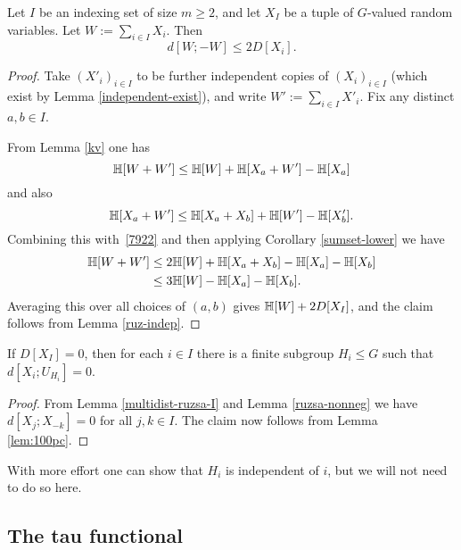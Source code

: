 \begin{lemma}\label{multidist-ruzsa-IV}
  Let $I$ be an indexing set of size $m \ge 2$, and let $X_{I}$ be a tuple of $G$-valued random variables.  Let $W := \sum_{i \in I} X_i$. Then
  $$ d[W;-W] \leq 2 D[X_i].$$
\end{lemma}

\begin{proof}
  Take $(X'_i)_{i \in I}$ to be further independent copies of $(X_i)_{i \in I}$ (which exist by Lemma \ref{independent-exist}), and write $W' := \sum_{i \in I} X'_i$.
  Fix any distinct $a,b \in I$.

  From Lemma \ref{kv} one has
  \begin{equation}\label{7922}
    \mathbb{H}[W + W'] \leq  \mathbb{H}[W] + \mathbb{H}[X_{a} + W'] - \mathbb{H}[X_{a}]
   \end{equation}
   and also
   \[ \mathbb{H}[X_a + W'] \leq \mathbb{H}[X_a + X_b] + \mathbb{H}[W'] - \mathbb{H}[X'_b].\]
   Combining this with~\eqref{7922} and then applying Corollary \ref{sumset-lower} we have
   \begin{align*}  \mathbb{H}[W + W']  & \leq    2\mathbb{H}[W] + \mathbb{H}[X_a + X_b]  - \mathbb{H}[X_a] - \mathbb{H}[X_b] \\ & \leq
    3 \mathbb{H}[W] - \mathbb{H}[X_a] - \mathbb{H}[X_b].
  \end{align*}
  Averaging this over all choices of $(a,b)$ gives $\mathbb{H}[W] + 2 D[X_I]$, and the claim follows from Lemma \ref{ruz-indep}.
\end{proof}

\begin{proposition}[Vanishing]\label{multi-zero}
If $D[X_I]=0$, then for each $i \in I$ there is a finite subgroup $H_i \leq G$ such that $d[X_i; U_{H_i}] = 0$.
\end{proposition}

\begin{proof}  From Lemma \ref{multidist-ruzsa-I} and Lemma \ref{ruzsa-nonneg} we have $d[X_j; X_{-k}]=0$ for all $j,k \in I$.  The claim now follows from Lemma \ref{lem:100pc}.
\end{proof}

With more effort one can show that $H_i$ is independent of $i$, but we will not need to do so here.

\subsection{The tau functional}

